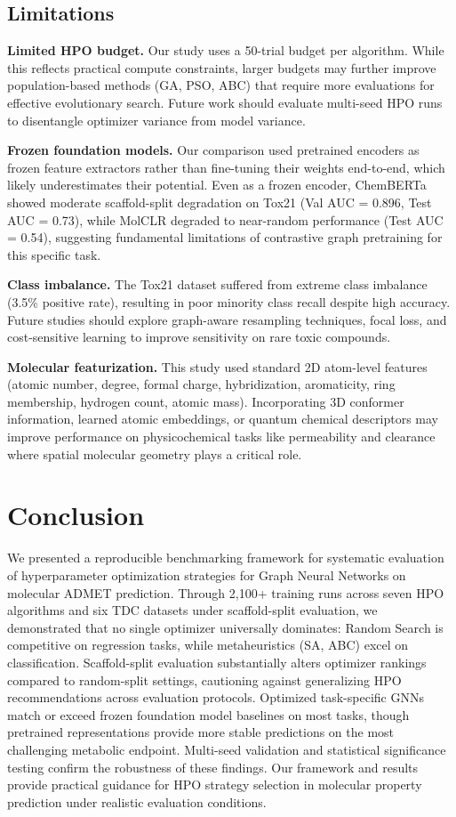 \documentclass[12pt]{article}
\begin{document}
\subsection{Limitations}

\textbf{Limited HPO budget.} Our study uses a 50-trial budget per algorithm. While this reflects practical compute constraints, larger budgets may further improve population-based methods (GA, PSO, ABC) that require more evaluations for effective evolutionary search. Future work should evaluate multi-seed HPO runs to disentangle optimizer variance from model variance.

\textbf{Frozen foundation models.} Our comparison used pretrained encoders as frozen feature extractors rather than fine-tuning their weights end-to-end, which likely underestimates their potential. Even as a frozen encoder, ChemBERTa showed moderate scaffold-split degradation on Tox21 (Val AUC = 0.896, Test AUC = 0.73), while MolCLR degraded to near-random performance (Test AUC = 0.54), suggesting fundamental limitations of contrastive graph pretraining for this specific task.

\textbf{Class imbalance.} The Tox21 dataset suffered from extreme class imbalance (3.5\% positive rate), resulting in poor minority class recall despite high accuracy. Future studies should explore graph-aware resampling techniques, focal loss, and cost-sensitive learning to improve sensitivity on rare toxic compounds.

\textbf{Molecular featurization.} This study used standard 2D atom-level features (atomic number, degree, formal charge, hybridization, aromaticity, ring membership, hydrogen count, atomic mass). Incorporating 3D conformer information, learned atomic embeddings, or quantum chemical descriptors may improve performance on physicochemical tasks like permeability and clearance where spatial molecular geometry plays a critical role.

\section{Conclusion}
\label{sec:conclusion}

We presented a reproducible benchmarking framework for systematic evaluation of hyperparameter optimization strategies for Graph Neural Networks on molecular ADMET prediction. Through 2{,}100+ training runs across seven HPO algorithms and six TDC datasets under scaffold-split evaluation, we demonstrated that no single optimizer universally dominates: Random Search is competitive on regression tasks, while metaheuristics (SA, ABC) excel on classification. Scaffold-split evaluation substantially alters optimizer rankings compared to random-split settings, cautioning against generalizing HPO recommendations across evaluation protocols. Optimized task-specific GNNs match or exceed frozen foundation model baselines on most tasks, though pretrained representations provide more stable predictions on the most challenging metabolic endpoint. Multi-seed validation and statistical significance testing confirm the robustness of these findings. Our framework and results provide practical guidance for HPO strategy selection in molecular property prediction under realistic evaluation conditions.
\end{document}

